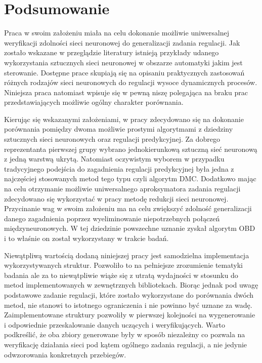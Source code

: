 \newpage %
\section{Podsumowanie}
\par Praca w swoim założeniu miała na celu dokonanie możliwie uniwersalnej weryfikacji zdolności sieci neuronowej do generalizacji zadania regulacji. Jak zostało wskazane w przeglądzie literatury istnieją przykłady udanego wykorzystania sztucznych sieci neuronowej w obszarze automatyki jakim jest sterowanie. Dostępne prace skupiają się na opisaniu praktycznych zastosowań różnych rodzajów sieci neuronowych do regulacji wysoce dynamicznych procesów. Niniejsza praca natomiast wpisuje się w pewną niszę polegająca na braku prac przedstawiających możliwie ogólny charakter porównania. 
\par Kierując się wskazanymi założeniami, w pracy zdecydowano się na dokonanie porównania pomiędzy dwoma możliwie prostymi algorytmami z dziedziny sztucznych sieci neuronowych oraz regulacji predykcyjnej. Za dobrego reprezentanta pierwszej grupy wybrano jednokierunkową sztuczną sieć neuronową z jedną warstwą ukrytą. Natomiast oczywistym wyborem w przypadku tradycyjnego podejścia do zagadnienia regulacji predykcyjnej była jedna z najczęściej stosowanych metod tego typu czyli algorytm DMC. Dodatkowo mając na celu otrzymanie możliwie uniwersalnego aproksymatora zadania regulacji zdecydowano się wykorzystać w pracy metodę redukcji sieci neuronowej. Przycinanie wag w swoim założeniu ma na celu zwiększyć zdolność generalizacji danego zagadnienia poprzez wyeliminowanie niepotrzebnych połączeń międzyneuronowych. W tej dziedzinie powszechne uznanie zyskał algorytm OBD i to właśnie on został wykorzystany w trakcie badań. 
\par Niewątpliwą wartością dodaną niniejszej pracy jest samodzielna implementacja wykorzystywanych struktur. Pozwoliło to na pełniejsze zrozumienie tematyki badania ale za to niewątpliwie wiąże się z utratą wydajności w stosunku do metod implementowanych w zewnętrznych bibliotekach. Biorąc jednak pod uwagę podstawowe zadanie regulacji, które zostało wykorzystane do porównania dwóch metod, nie stanowi to istotnego ograniczenia i nie powinno być uznane za wadę. Zaimplementowane struktury pozwoliły w pierwszej kolejności na wygenerowanie i odpowiednie przeskalowanie danych uczących i weryfikujących. Warto podkreślić, że oba zbiory generowane były w sposób niezależny co pozwala na weryfikację działania sieci pod kątem ogólnego zadania regulacji, a nie jedynie odwzorowania konkretnych przebiegów.
